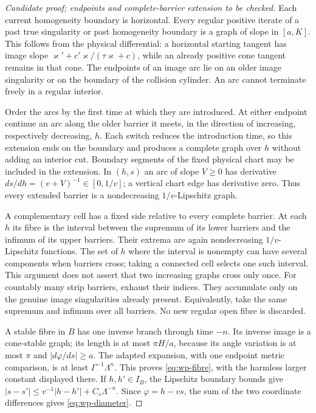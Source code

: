 \begin{proof}[Candidate proof; endpoints and complete-barrier extension to be checked]
Each current homogeneity boundary is horizontal.  Every regular
positive iterate of a past true singularity or past homogeneity
boundary is a graph of slope in $[a,K]$.  This follows from the
physical differential: a horizontal starting tangent has image
slope $\varkappa'+c'\varkappa/(\tau\varkappa+c)$, while an already
positive cone tangent remains in that cone.
The endpoints of an image arc lie on an older image singularity or
on the boundary of the collision cylinder.  An arc cannot terminate
freely in a regular interior.

Order the arcs by the first time at which they are introduced.
At either endpoint continue an arc along the older barrier it meets,
in the direction of increasing, respectively decreasing, $h$.
Each switch reduces the introduction time, so this extension ends
on the boundary and produces a complete graph over $h$ without adding
an interior cut.  Boundary segments of the fixed physical chart may
be included in the extension.
In $(h,s)$ an arc of slope $V\ge0$ has derivative
$ds/dh=(v+V)^{-1}\in[0,1/v]$; a vertical chart edge has derivative zero.
Thus every extended barrier is a nondecreasing $1/v$-Lipschitz graph.

A complementary cell has a fixed side relative to every complete
barrier.  At each $h$ its fibre is the interval between the supremum
of its lower barriers and the infimum of its upper barriers.
Their extrema are again nondecreasing $1/v$-Lipschitz functions.
The set of $h$ where the interval is nonempty can have several
components when barriers cross; taking a connected cell selects
one such interval.  This argument does not assert that two
increasing graphs cross only once.
For countably many strip barriers, exhaust their indices.  They
accumulate only on the genuine image singularities already present.
Equivalently, take the same supremum and infimum over all barriers.
No new regular open fibre is discarded.

A stable fibre in $B$ has one inverse branch through time $-n$.
Its inverse image is a cone-stable graph; its length is at most
$\pi H/a$, because its angle variation is at most $\pi$ and
$|d\varphi/ds|\ge a$.
The adapted expansion, with one endpoint metric comparison, is
at least $\Gamma^{-1}\Lambda^n$.
This proves \eqref{eq:wp-fibre}, with the harmless larger constant
displayed there.  If $h,h'\in I_B$, the Lipschitz boundary bounds give
$|s-s'|\le v^{-1}|h-h'|+C_s\Lambda^{-n}$.
Since $\varphi=h-vs$, the sum of the two coordinate differences gives
\eqref{eq:wp-diameter}.
\end{proof}

